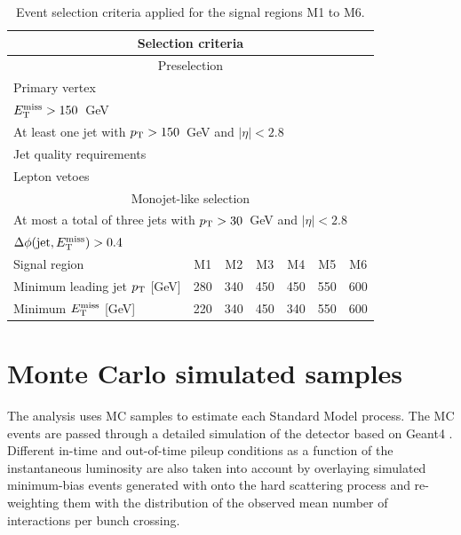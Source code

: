 \begin{table}[!ht]
  \renewcommand{\baselinestretch}{1}
  \begin{center}
    \begin{small}
      \begin{tabular*}{\textwidth}{@{\extracolsep{\fill}}lcccccc}\hline\hline
        \multicolumn{7}{c}{\small{\textbf{Selection criteria}}} \\\hline
        \multicolumn{7}{c}{{\small{Preselection}} } \\\hline
        \multicolumn{7}{l}{Primary vertex}\\
        \multicolumn{7}{l}{$E_{\mathrm{T}}^{\mathrm{miss}} > 150$~GeV }\\
        \multicolumn{7}{l}{At least one jet with $p_{\mathrm{T}} >150$~GeV and $|\eta|< 2.8$}\\
        \multicolumn{7}{l}{Jet quality requirements}   \\
        \multicolumn{7}{l}{Lepton vetoes}\\ \hline
        \multicolumn{7}{c}{\small{Monojet-like selection}}\\\hline
        \multicolumn{7}{l}{At most a total of three jets with $p_{\mathrm{T}} > 30$~GeV and $|\eta|<2.8$}\\
        \multicolumn{7}{l}{$\Delta\phi(\text{jet}, \met) > 0.4$} \\\hline
        Signal region                   & M1  & M2  & M3  & M4  & M5  & M6  \\
        Minimum leading jet $p_{\mathrm{T}}$ [GeV] & 280 & 340 & 450 & 450 & 550 & 600 \\
        Minimum $E_{\mathrm{T}}^{\mathrm{miss}}$ [GeV]            & 220 & 340 & 450 & 340 & 550 & 600 \\ \hline\hline
      \end{tabular*}
    \end{small}
  \end{center}
  \caption{Event selection criteria applied for the signal regions M1 to M6.}
  \label{tab:SignalRegionCuts}
\end{table}


\section{Monte Carlo simulated samples}
    \label{sec:MCSamples}

The analysis uses MC samples to estimate each Standard Model process.
The MC events are passed through a detailed simulation of the detector based on {\sc Geant4} \cite{Agostinelli:2002hh}.
Different in-time and out-of-time pileup conditions as a function of the instantaneous luminosity are also taken into account by overlaying simulated minimum-bias events generated with  onto the hard scattering process and re-weighting them with the distribution of the observed mean number of interactions per bunch crossing.


